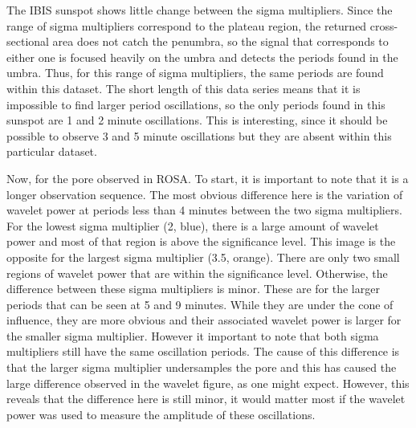     The IBIS sunspot shows little change between the sigma multipliers.
    Since the range of sigma multipliers correspond to the plateau region, the returned cross-sectional area does not catch the penumbra, so the signal that corresponds to either one is focused heavily on the umbra and detects the periods found in the umbra.
    Thus, for this range of sigma multipliers, the same periods are found within this dataset.
    The short length of this data series means that it is impossible to find larger period oscillations, so the only periods found in this sunspot are 1 and 2 minute oscillations.
    This is interesting, since it should be possible to observe 3 and 5 minute oscillations but they are absent within this particular dataset.
       
    Now, for the pore observed in ROSA.
    To start, it is important to note that it is a longer observation sequence.
    The most obvious difference here is the variation of wavelet power at periods less than 4 minutes between the two sigma multipliers. 
    For the lowest sigma multiplier (2, blue), there is a large amount of wavelet power and most of that region is above the significance level. 
    This image is the opposite for the largest sigma multiplier (3.5, orange).
    There are only two small regions of wavelet power that are within the significance level.
    Otherwise, the difference between these sigma multipliers is minor.
    These are for the larger periods that can be seen at 5 and 9 minutes.
    While they are under the cone of influence, they are more obvious and their associated wavelet power is larger for the smaller sigma multiplier.
    However it important to note that both sigma multipliers still have the same oscillation periods.
    The cause of this difference is that the larger sigma multiplier undersamples the pore and this has caused the large difference observed in the wavelet figure, as one might expect.
    However, this reveals that the difference here is still minor, it would matter most if the wavelet power was used to measure the amplitude of these oscillations.


